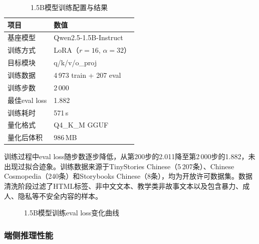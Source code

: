 \documentclass[lettersize,journal]{IEEEtran}
\begin{document}
\begin{table}[H]
    \centering
    \caption{1.5B模型训练配置与结果}
    \label{tab:train}
    \footnotesize
    \begin{tabular}{ll}
        \toprule
        \textbf{项目} & \textbf{数值} \\
        \midrule
        基座模型 & Qwen2.5-1.5B-Instruct \\
        训练方式 & LoRA（$r\!=\!16$, $\alpha\!=\!32$） \\
        目标模块 & q/k/v/o\_proj \\
        训练数据 & 4\,973 train + 207 eval \\
        训练步数 & 2\,000 \\
        最佳eval loss & 1.882 \\
        训练耗时 & 571\,s \\
        量化格式 & Q4\_K\_M GGUF \\
        量化后体积 & 986\,MB \\
        \bottomrule
    \end{tabular}
\end{table}

训练过程中eval loss随步数逐步降低，从第200步的2.011降至第2\,000步的1.882，未出现过拟合迹象。训练数据来源于TinyStories Chinese（5\,207条）、Chinese Cosmopedia（240条）和Storybooks Chinese（8条），均为开放许可数据集。数据清洗阶段过滤了HTML标签、非中文文本、教学类非故事文本以及包含暴力、成人、隐私等不安全内容的样本。

\begin{figure}[H]
    \centering
    \caption{1.5B模型训练eval loss变化曲线}
    \label{fig:loss}
\end{figure}

\subsubsection{端侧推理性能}
\end{document}
